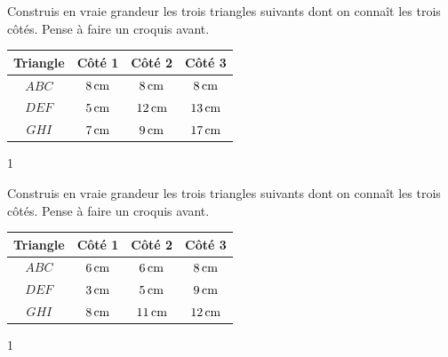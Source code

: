 \documentclass[a4paper,11pt]{report}
\begin{document}
\begin{exo}{Construis en vraie grandeur les trois triangles suivants dont on connaît les trois côtés. Pense à faire un croquis avant.

		\vspace{-0.25cm}
\begin{center}
\begin{tabular}{|c|c|c|c|}
    \hline
    \textbf{Triangle} & \textbf{Côté 1} & \textbf{Côté 2} & \textbf{Côté 3} \\
    \hline
$ABC$ & $\tunit{8}{cm}$ & $\tunit{8}{cm}$ & $\tunit{8}{cm}$ \\
    \hline
$DEF$ & $\tunit{5}{cm}$ & $\tunit{12}{cm}$ & $\tunit{13}{cm}$ \\
    \hline
$GHI$ & $\tunit{7}{cm}$ & $\tunit{9}{cm}$ & $\tunit{17}{cm}$ \\
    \hline
\end{tabular}
\end{center}
\vspace{-0.65cm}
}{1}
\end{exo}

\begin{exo}{Construis en vraie grandeur les trois triangles suivants dont on connaît les trois côtés. Pense à faire un croquis avant. 

		\vspace{-0.25cm}
\begin{center}
\begin{tabular}{|c|c|c|c|}
    \hline
    \textbf{Triangle} & \textbf{Côté 1} & \textbf{Côté 2} & \textbf{Côté 3} \\
    \hline
    $ABC$ & $\tunit{6}{cm}$ & $\tunit{6}{cm}$ & $\tunit{8}{cm}$ \\
    \hline
    $DEF$ & $\tunit{3}{cm}$ & $\tunit{5}{cm}$ & $\tunit{9}{cm}$ \\
    \hline
    $GHI$ & $\tunit{8}{cm}$ & $\tunit{11}{cm}$ & $\tunit{12}{cm}$ \\
    \hline
\end{tabular}
\end{center}
\vspace{-0.65cm}
}{1}
\end{exo}
\end{document}
